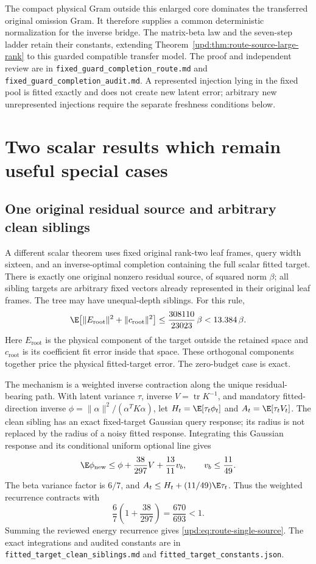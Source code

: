 \documentclass[11pt,oneside,openany,a4paper]{book}
\numberwithin{equation}{chapter}
\theoremstyle{definition}
\theoremstyle{remark}
\DeclareMathOperator{\tr}{tr}\DeclareMathOperator{\rank}{rank}
\newcommand{\sourcefile}[1]{{\small\nolinkurl{#1}}}
\begin{document}
The compact physical Gram outside this enlarged core dominates the
transferred original omission Gram.  It therefore supplies a common
deterministic normalization for the inverse bridge.  The matrix-beta
law and the seven-step ladder retain their constants, extending
Theorem~\ref{upd:thm:route-source-large-rank} to this guarded compatible
transfer model.  The proof and independent review are in
\sourcefile{fixed_guard_completion_route.md} and
\sourcefile{fixed_guard_completion_audit.md}.  A represented injection
lying in the fixed pool is fitted exactly and does not create new
latent error; arbitrary new unrepresented injections require the
separate freshness conditions below.

\section{Two scalar results which remain useful special cases}

\subsection{One original residual source and arbitrary clean siblings}

A different scalar theorem uses fixed original rank-two leaf frames,
query width sixteen, and an inverse-optimal completion containing the
full scalar fitted target.  There is exactly one original nonzero
residual source, of squared norm $\beta$; all sibling targets are
arbitrary fixed vectors already represented in their original leaf
frames.  The tree may have unequal-depth siblings.  For this rule,
\begin{equation}
 \E\bigl[\lVert E_{\mathrm{root}}\rVert^2
                 +\lVert c_{\mathrm{root}}\rVert^2\bigr]
 \leq\frac{308110}{23023}\,\beta<13.384\,\beta.
 \label{upd:eq:route-single-source}
\end{equation}
Here $E_{\mathrm{root}}$ is the physical component of the target outside
the retained space and $c_{\mathrm{root}}$ is its coefficient fit error
inside that space.  These orthogonal components together price the
physical fitted-target error.  The zero-budget case is exact.

The mechanism is a weighted inverse contraction along the unique
residual-bearing path.  With latent variance $\tau$, inverse
$V=\tr K^{-1}$, and mandatory fitted-direction inverse
$\phi=\lVert\alpha\rVert^2/(\alpha^TK\alpha)$, let
$H_t=\E[\tau_t\phi_t]$ and $A_t=\E[\tau_tV_t]$.
The clean sibling has an exact fixed-target Gaussian query response;
its radius is not replaced by the radius of a noisy fitted response.
Integrating this Gaussian response and its conditional uniform optional
line gives
\[
 \E\phi_{\mathrm{new}}\leq\phi+\frac{38}{297}V
                         +\frac{13}{11}v_b,
 \qquad v_b\leq\frac{11}{49}.
\]
The beta variance factor is $6/7$, and
$A_t\leq H_t+(11/49)\E\tau_t$.
Thus the weighted recurrence contracts with
\[
 \frac67\left(1+\frac{38}{297}\right)
 =\frac{670}{693}<1.
\]
Summing the reviewed energy recurrence gives
\eqref{upd:eq:route-single-source}.  The exact integrations and audited
constants are in \sourcefile{fitted_target_clean_siblings.md} and
\sourcefile{fitted_target_constants.json}.
\end{document}
